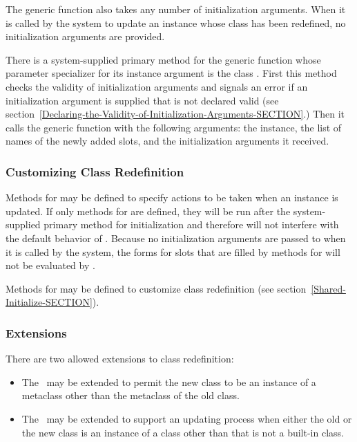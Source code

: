 The generic function  also
takes any number of initialization arguments.  When it is called by
the system to update an instance whose class has been redefined, no
initialization arguments are provided.

There is a system-supplied primary method for the generic function
 whose parameter specializer for
its instance argument is the class .  First this
method checks the validity of initialization arguments and signals an
error if an initialization argument is supplied that is not declared
valid (see
section~\ref{Declaring-the-Validity-of-Initialization-Arguments-SECTION}.)
Then it calls the generic function
 with the following arguments: the instance,
the list of names of the newly added slots, and the initialization
arguments it received.


\subsubsection{Customizing Class Redefinition}

Methods for  may be defined
to specify actions to be taken when an instance is updated.  If only
 methods for  are
defined, they will be run after the system-supplied primary method for
initialization and therefore will not interfere with the default
behavior of .  Because no
initialization arguments are passed to 
 when it is called by the system,
the  forms for slots that are filled by 
methods for  will not be
evaluated by .

Methods for  may be defined to customize class
redefinition (see section~\ref{Shared-Initialize-SECTION}).


\subsubsection{Extensions}

There are two allowed extensions to class redefinition: 

\begin{itemize}

\item  The \OS\ may be extended to permit the new class
to be an instance of a metaclass other than the metaclass of the
old class.

\item  The \OS\ may be extended to support an updating process
when either the old or the new class is an instance of a
class other than  that is not a built-in class.

\end{itemize}


